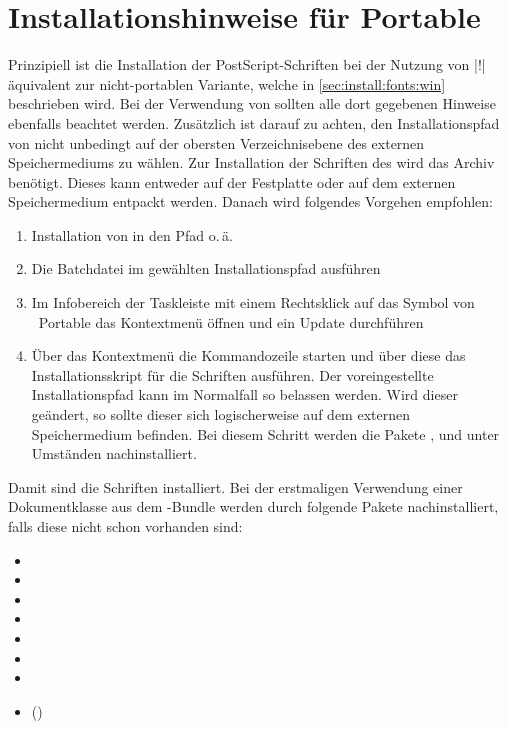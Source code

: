 \section{Installationshinweise für  Portable}
\label{sec:install:portable}

Prinzipiell ist die Installation der PostScript-Schriften bei der Nutzung von 
|!| äquivalent zur nicht-portablen 
Variante, welche in \autoref{sec:install:fonts:win} beschrieben wird. Bei der 
Verwendung von  sollten alle dort 
gegebenen Hinweise ebenfalls beachtet werden. Zusätzlich ist darauf zu achten, 
den Installationspfad von  nicht 
unbedingt auf der obersten Verzeichnisebene des externen Speichermediums zu 
wählen. Zur Installation der Schriften des \CDs wird das Archiv
%
{} benötigt. Dieses kann entweder 
auf der Festplatte oder auf dem externen Speichermedium entpackt werden. Danach 
wird folgendes Vorgehen empfohlen:
%
\begin{enumerate}
\item Installation von  in den Pfad
   o.\,ä.
\item Die Batchdatei  im gewählten Installationspfad 	
  ausführen
\item Im Infobereich der Taskleiste mit einem Rechtsklick auf das Symbol von  
  ~Portable das Kontextmenü öffnen und ein Update durchführen
\item Über das Kontextmenü die Kommandozeile starten und über diese das 
  Installationsskript für die Schriften  
  ausführen. Der voreingestellte Installationspfad kann im Normalfall so 
  belassen werden. Wird dieser geändert, so sollte dieser sich logischerweise 
  auf dem externen Speichermedium befinden. Bei diesem Schritt werden die 
  Pakete ,  und  unter 
  Umständen nachinstalliert.
\end{enumerate}
%
Damit sind die Schriften installiert. Bei der erstmaligen Verwendung einer 
Dokumentklasse aus dem \TUDScript-Bundle werden durch  folgende 
Pakete nachinstalliert, falls diese nicht schon vorhanden sind:
%
\begin{itemize}
\item {}
\item {}
\item {}
\item {}
\item {}
\item {}
\item {}
\item {}()
\end{itemize}
